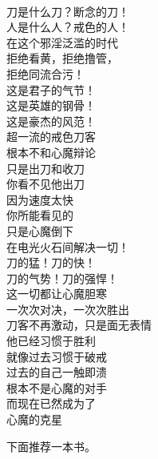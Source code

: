 \begin{poem}[戒色悍刀行]
    \begin{multicols}{2}
        \begin{center}~\\
            刀是什么刀？断念的刀！ \\ 人是什么人？戒色的人！ \\ 在这个邪淫泛滥的时代 \\ 拒绝看黄，拒绝撸管， \\ 拒绝同流合污！ \\ 这是君子的气节！ \\ 这是英雄的钢骨！ \\ 这是豪杰的风范！ \\ 超一流的戒色刀客 \\ 根本不和心魔辩论 \\ 只是出刀和收刀 \\ 你看不见他出刀 \\ 因为速度太快 \\ 你所能看见的 \\ 只是心魔倒下 \\ 在电光火石间解决一切！ \\ 刀的猛！刀的快！ \\ 刀的气势！刀的强悍！ \\ 这一切都让心魔胆寒 \\ 一次次对决，一次次胜出 \\ 刀客不再激动，只是面无表情 \\ 他已经习惯于胜利 \\ 就像过去习惯于破戒 \\ 过去的自己一触即溃 \\ 根本不是心魔的对手 \\ 而现在已然成为了 \\ 心魔的克星
        \end{center}
    \end{multicols}
\end{poem}

下面推荐一本书。

